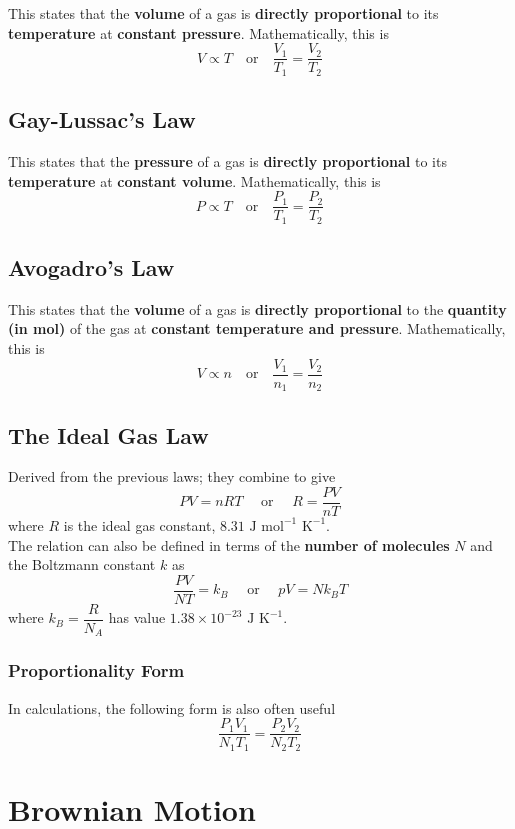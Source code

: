 \documentclass[a4paper,12pt]{article}
\let\oldsection\section
\renewcommand\section{\clearpage\oldsection}
\newcommand{\eqor}{\quad \text{or} \quad}
\newcommand{\lb}{\\[8pt]}
\begin{document}
This states that the \textbf{volume} of a gas is \textbf{directly proportional} to its \textbf{temperature} at \textbf{constant pressure}. Mathematically, this is
$$V\propto T \eqor \frac{V_1}{T_1} = \frac{V_2}{T_2}$$

\subsection{Gay-Lussac's Law}

This states that the \textbf{pressure} of a gas is \textbf{directly proportional} to its \textbf{temperature} at \textbf{constant volume}. Mathematically, this is
$$P \propto T  \eqor \frac{P_1}{T_1} = \frac{P_2}{T_2}$$

\subsection{Avogadro's Law}

This states that the \textbf{volume} of a gas is \textbf{directly proportional} to the \textbf{quantity (in mol)} of the gas at \textbf{constant temperature and pressure}. Mathematically, this is
$$V \propto n \eqor \frac{V_1}{n_1} = \frac{V_2}{n_2}$$

\pagebreak

\subsection{The Ideal Gas Law}
Derived from the previous laws; they combine to give
$$PV = nRT \quad \text{ or } \quad R = \frac{PV}{nT}$$
where $R$ is the ideal gas constant, $8.31 \text{ J mol}^{-1} \text{ K}^{-1}$.\lb
The relation can also be defined in terms of the \textbf{number of molecules} $N$ and the Boltzmann constant $k$ as
\begin{equation}\label{eq:ideal_gas}
  \frac{PV}{NT} = k_B \quad \text{ or } \quad pV = Nk_BT
\end{equation}
where $k_B = \dfrac{R}{N_A}$ has value $1.38 \times 10^{-23} \text{ J K}^{-1}$.

\subsubsection{Proportionality Form}
In calculations, the following form is also often useful
$$\frac{P_1V_1}{N_1T_1} = \frac{P_2V_2}{N_2T_2}$$

\section{Brownian Motion}
\end{document}
